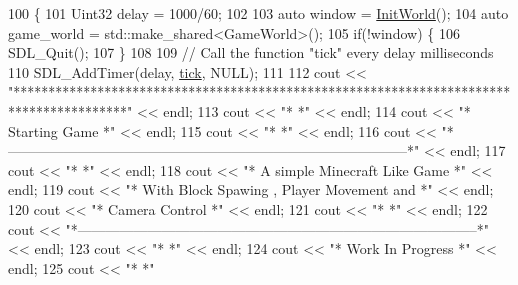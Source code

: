 \begin{DoxyCode}
100                      \{
101     Uint32 delay = 1000/60;
102 
103   \textcolor{keyword}{auto} window = \hyperlink{class_game_loop_afcbeaf01f4a6d443753ccabbadbec8d7}{InitWorld}();
104   \textcolor{keyword}{auto} game\_world = std::make\_shared<GameWorld>();
105   \textcolor{keywordflow}{if}(!window) \{
106     SDL\_Quit();
107   \} 
108 
109   \textcolor{comment}{// Call the function "tick" every delay milliseconds}
110   SDL\_AddTimer(delay, \hyperlink{_game_loop_8cc_a70eaa727262f633037c3f4b7d3ff24c2}{tick}, NULL);
111 
112         cout << \textcolor{stringliteral}{"****************************************************************************************"} 
      << endl;
113         cout << \textcolor{stringliteral}{"*                                                                                      *"} 
      << endl;
114         cout << \textcolor{stringliteral}{"*                                     Starting Game                                    *"} 
      << endl;
115         cout << \textcolor{stringliteral}{"*                                                                                      *"} 
      << endl;
116         cout << \textcolor{stringliteral}{"*--------------------------------------------------------------------------------------*"} 
      << endl;
117         cout << \textcolor{stringliteral}{"*                                                                                      *"} 
      << endl;
118         cout << \textcolor{stringliteral}{"*                               A simple Minecraft Like Game                           *"} 
      << endl;
119         cout << \textcolor{stringliteral}{"*                        With Block Spawing , Player Movement and                      *"} 
      << endl;
120         cout << \textcolor{stringliteral}{"*                                     Camera Control                                   *"} 
      << endl;
121         cout << \textcolor{stringliteral}{"*                                                                                      *"} 
      << endl;
122         cout << \textcolor{stringliteral}{"*--------------------------------------------------------------------------------------*"} 
      << endl;
123         cout << \textcolor{stringliteral}{"*                                                                                      *"} 
      << endl;
124         cout << \textcolor{stringliteral}{"*                                    Work In Progress                                  *"} 
      << endl;
125         cout << \textcolor{stringliteral}{"*                                                                                      *"} 

\end{DoxyCode}
